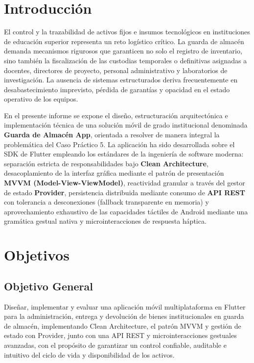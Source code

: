 \documentclass[12pt,a4paper]{article}
\begin{document}
\newpage

\tableofcontents
\newpage
\listoffigures
\listoftables
\newpage
\setcounter{page}{1}

\section{Introducción}
El control y la trazabilidad de activos fijos e insumos tecnológicos en instituciones de educación superior representa un reto logístico crítico. La guarda de almacén demanda mecanismos rigurosos que garanticen no solo el registro de inventario, sino también la fiscalización de las custodias temporales o definitivas asignadas a docentes, directores de proyecto, personal administrativo y laboratorios de investigación. La ausencia de sistemas estructurados deriva frecuentemente en desabastecimiento imprevisto, pérdida de garantías y opacidad en el estado operativo de los equipos.

En el presente informe se expone el diseño, estructuración arquitectónica e implementación técnica de una solución móvil de grado institucional denominada \textbf{Guarda de Almacén App}, orientada a resolver de manera integral la problemática del Caso Práctico 5. La aplicación ha sido desarrollada sobre el SDK de Flutter empleando los estándares de la ingeniería de software moderna: separación estricta de responsabilidades bajo \textbf{Clean Architecture}, desacoplamiento de la interfaz gráfica mediante el patrón de presentación \textbf{MVVM (Model-View-ViewModel)}, reactividad granular a través del gestor de estado \textbf{Provider}, persistencia distribuida mediante consumo de \textbf{API REST} con tolerancia a desconexiones (fallback transparente en memoria) y aprovechamiento exhaustivo de las capacidades táctiles de Android mediante una gramática gestual nativa y microinteracciones de respuesta háptica.

\section{Objetivos}

\subsection{Objetivo General}
Diseñar, implementar y evaluar una aplicación móvil multiplataforma en Flutter para la administración, entrega y devolución de bienes institucionales en guarda de almacén, implementando Clean Architecture, el patrón MVVM y gestión de estado con Provider, junto con una API REST y microinteracciones gestuales avanzadas, con el propósito de garantizar un control confiable, auditable e intuitivo del ciclo de vida y disponibilidad de los activos.
\end{document}
